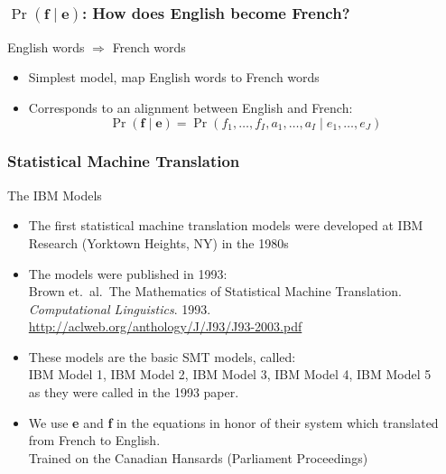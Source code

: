 \begin{frame}
\frametitle{$\Pr( \textbf{f} \mid \textbf{e} )$: How does English become French?}
\begin{alertblock}{English words $\Rightarrow$ French words}
\begin{itemize}
\item Simplest model, map English words to French words
\item Corresponds to an alignment between English and French:
\[ \Pr( \textbf{f} \mid \textbf{e} ) = \Pr(f_1, \ldots, f_I, a_1, \ldots, a_I \mid e_1, \ldots, e_J) \]
\end{itemize}
\end{alertblock}
\end{frame}

\begin{frame}
\frametitle{Statistical Machine Translation}
\begin{block}{The IBM Models}
\begin{itemize}[<+->]
\item The first statistical machine translation models were developed at IBM Research (Yorktown Heights, NY) in the 1980s
\item The models were published in 1993: \\
{\small Brown et.\ al.\ The Mathematics of Statistical Machine Translation. \textit{Computational Linguistics}. 1993.} \\
{\small \url{http://aclweb.org/anthology/J/J93/J93-2003.pdf}}
\item These models are the basic SMT models, called: \\
IBM Model 1, IBM Model 2, IBM Model 3, IBM Model 4, IBM Model 5 \\
as they were called in the 1993 paper.
\item We use \textbf{e} and \textbf{f} in the equations in honor of their system which translated from French to English.\\
Trained on the Canadian Hansards (Parliament Proceedings)
\end{itemize}
\end{block}
\end{frame}




